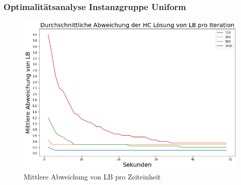 \documentclass{beamer}
\begin{document}
\begin{frame}

\frametitle{Optimalitätsanalyse Instanzgruppe Uniform}

\begin{figure}[!htbp]
\begin{center}
\includegraphics[scale=0.3]{img/uniform_time.png}
\end{center}
\caption{Mittlere Abweichung von LB pro Zeiteinheit}
\label{fig:architecture}
\end{figure}



\end{frame}
\end{document}
